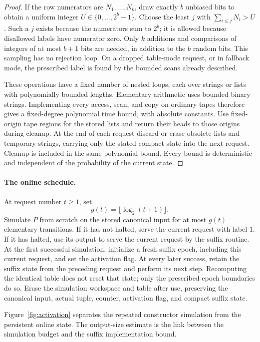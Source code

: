 \begin{proof}
If the row numerators are $N_1,\ldots,N_k$, draw exactly $b$ unbiased bits
to obtain a uniform integer $U\in\{0,\ldots,2^b-1\}$.  Choose the least
$j$ with $\sum_{i\le j}N_i>U$.  Such a $j$ exists because the numerators
sum to $2^b$; it is allowed because disallowed labels have numerator zero.
Only $k$ additions and comparisons of integers of at most $b+1$ bits are
needed, in addition to the $b$ random bits.  This sampling has no rejection
loop.  On a dropped table-mode request, or in fallback mode, the prescribed
label is found by the bounded scans already described.

These operations have a fixed number of nested loops, each over strings
or lists with polynomially bounded lengths.  Elementary arithmetic uses
bounded binary strings.  Implementing every access, scan, and copy on
ordinary tapes therefore gives a fixed-degree polynomial time bound, with
absolute constants. Use fixed-origin tape regions for the stored lists
and return their heads to those origins during cleanup.
At the end of each request discard or erase obsolete
lists and temporary strings, carrying only the stated compact state into
the next request.  Cleanup is included in the same polynomial bound.
Every bound is deterministic and independent of the probability of the
current state.
\end{proof}

\paragraph{The online schedule.}
At request number $t\ge1$, set
\begin{equation}
 g(t)=\lfloor\log_2(t+1)\rfloor.
 \label{eq:schedule-budget}
\end{equation}
Simulate $P$ from scratch on the stored canonical input for at most $g(t)$
elementary transitions.  If it has not halted, serve the current request
with label $1$.  If it has halted, use its output to serve the current
request by the suffix routine.  At the first successful simulation,
initialize a fresh suffix epoch, including this current request, and set
the activation flag.  At every later success, retain the suffix state
from the preceding request and perform its next step.  Recomputing the
identical table does not reset that state; only the prescribed epoch
boundaries do so.  Erase the simulation workspace and table after use,
preserving the canonical input, actual tuple, counter, activation flag,
and compact suffix state.

Figure~\ref{fig:activation} separates the repeated constructor simulation
from the persistent online state. The output-size estimate is the link
between the simulation budget and the suffix implementation bound.

